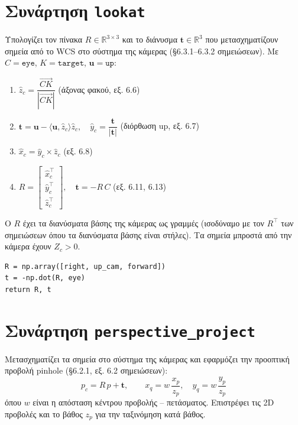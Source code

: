 \documentclass{article}
\begin{document}
\section{Συνάρτηση \texttt{lookat}}

Υπολογίζει τον πίνακα $R \in \mathbb{R}^{3\times3}$ και το διάνυσμα
$\mathbf{t} \in \mathbb{R}^3$ που μετασχηματίζουν σημεία από το WCS στο σύστημα
της κάμερας (§6.3.1--6.3.2 σημειώσεων). Με $C = \mathtt{eye}$, $K = \mathtt{target}$,
$\mathbf{u} = \mathtt{up}$:

\begin{enumerate}
  \item $\hat{z}_c = \dfrac{\overrightarrow{CK}}{|\overrightarrow{CK}|}$ \quad (άξονας φακού, εξ. 6.6)
  \item $\mathbf{t} = \mathbf{u} - \langle\mathbf{u},\hat{z}_c\rangle\hat{z}_c,\quad
        \hat{y}_c = \dfrac{\mathbf{t}}{|\mathbf{t}|}$ \quad (διόρθωση up, εξ. 6.7)
  \item $\hat{x}_c = \hat{y}_c \times \hat{z}_c$ \quad (εξ. 6.8)
  \item $R = \begin{bmatrix}\hat{x}_c^\top\\\hat{y}_c^\top\\\hat{z}_c^\top\end{bmatrix}, \quad
        \mathbf{t} = -R\,C$ \quad (εξ. 6.11, 6.13)
\end{enumerate}

Ο $R$ έχει τα διανύσματα βάσης της κάμερας ως γραμμές (ισοδύναμο με τον $R^\top$
των σημειώσεων όπου τα διανύσματα βάσης είναι στήλες). Τα σημεία μπροστά από
την κάμερα έχουν $Z_c > 0$.

\begin{lstlisting}
R = np.array([right, up_cam, forward])
t = -np.dot(R, eye)
return R, t
\end{lstlisting}

\section{Συνάρτηση \texttt{perspective\_project}}

Μετασχηματίζει τα σημεία στο σύστημα της κάμερας και εφαρμόζει την
προοπτική προβολή pinhole (§6.2.1, εξ. 6.2 σημειώσεων):
\[
p_c = R\,p + \mathbf{t}, \qquad
x_q = w\,\frac{x_p}{z_p}, \quad y_q = w\,\frac{y_p}{z_p}
\]
όπου $w$ είναι η απόσταση κέντρου προβολής -- πετάσματος. Επιστρέφει τις
2D προβολές και το βάθος $z_p$ για την ταξινόμηση κατά βάθος.
\end{document}
